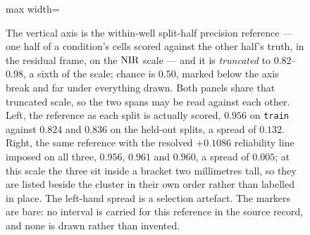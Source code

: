 \begin{figure}[tbp]
\begin{fullwidth}
\begin{adjustbox}{max width=\linewidth}
%
\end{adjustbox}
\caption[The split references, before and after matching]{ The vertical axis is the within-well split-half precision
reference --- one half of a condition's cells scored against the other half's
truth, in the residual frame, on the $\textrm{NIR}$ scale --- and it is
\emph{truncated} to $0.82$--$0.98$, a sixth of the scale; chance is $0.50$,
marked below the axis break and far under everything drawn. Both panels share
that truncated scale, so the two spans may be read against each other. Left,
the reference as each split is actually scored, $0.956$ on \texttt{train}
against $0.824$ and $0.836$ on the held-out splits, a spread of $0.132$. Right,
the same reference with the resolved $+0.1086$ reliability line imposed on all
three, $0.956$, $0.961$ and $0.960$, a spread of $0.005$; at this scale the
three sit inside a bracket two millimetres tall, so they are listed beside the
cluster in
their own order rather than labelled in place. The left-hand spread is a
selection artefact. The markers are bare: no interval is carried for this
reference in the source record, and none is drawn rather than invented.\label{fig:splitref}}
\end{fullwidth}
\end{figure}
